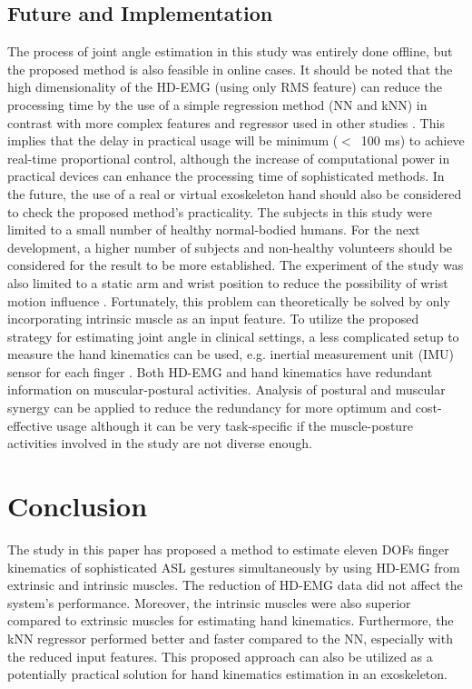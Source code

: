 \documentclass[conference]{IEEEtran}
\begin{document}
\subsection{Future and Implementation}
The process of joint angle estimation in this study was entirely done offline, but the proposed method 
is also feasible in online cases. It should be noted that the high dimensionality of the HD-EMG (using only 
RMS feature) can reduce the processing time by the use of a simple regression method (NN and kNN) in 
contrast with more complex features and regressor used in other studies \cite{b16}\cite{b19}. This implies that the delay 
in practical usage will be minimum ($<$~100 ms) to achieve real-time proportional control, although the 
increase of computational power in practical devices can enhance the processing time of sophisticated
methods. In the future, the use of a real or virtual exoskeleton hand should also be considered to check the 
proposed method's practicality.
The subjects in this study were limited to a small number of healthy normal-bodied humans. For the next 
development, a higher number of subjects and non-healthy volunteers should be considered for the result to 
be more established. The experiment of the study was also limited to a static arm and wrist position to reduce 
the possibility of wrist motion influence \cite{b39}. Fortunately, this problem can theoretically be solved by only 
incorporating intrinsic muscle as an input feature. To utilize the proposed strategy for estimating joint angle 
in clinical settings, a less complicated setup to measure the hand kinematics can be used, e.g. inertial 
measurement unit (IMU) sensor for each finger \cite{b40}.
Both HD-EMG and hand kinematics have redundant information on muscular-postural activities.
Analysis of postural and muscular synergy \cite{b36} can be applied to reduce the redundancy for more optimum 
and cost-effective usage although it can be very task-specific \cite{b41} if the muscle-posture activities involved 
in the study are not diverse enough.

\section{Conclusion}
The study in this paper has proposed a method to estimate eleven DOFs finger kinematics of 
sophisticated ASL gestures simultaneously by using HD-EMG from extrinsic and intrinsic muscles. The 
reduction of HD-EMG data did not affect the system's performance. Moreover, the intrinsic muscles were 
also superior compared to extrinsic muscles for estimating hand kinematics. Furthermore, the kNN 
regressor performed better and faster compared to the NN, especially with the reduced input features. This 
proposed approach can also be utilized as a potentially practical solution for hand kinematics estimation in 
an exoskeleton.
\end{document}
